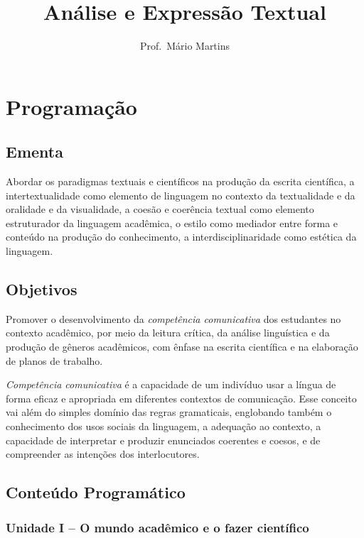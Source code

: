 \documentclass[
]{book}
\title{Análise e Expressão Textual}
\author{Prof.~Mário Martins}
\date{}
\begin{document}
\maketitle

{
\setcounter{tocdepth}{1}
\tableofcontents
}
\chapter{Programação}\label{programauxe7uxe3o}

\section{Ementa}\label{ementa}

Abordar os paradigmas textuais e científicos na produção da escrita científica, a intertextualidade como elemento de linguagem no contexto da textualidade e da oralidade e da visualidade, a coesão e coerência textual como elemento estruturador da linguagem acadêmica, o estilo como mediador entre forma e conteúdo na produção do conhecimento, a interdisciplinaridade como estética da linguagem.

\section{Objetivos}\label{objetivos}

Promover o desenvolvimento da \emph{competência comunicativa} dos estudantes no contexto acadêmico, por meio da leitura crítica, da análise linguística e da produção de gêneros acadêmicos, com ênfase na escrita científica e na elaboração de planos de trabalho.

\emph{Competência comunicativa} é a capacidade de um indivíduo usar a língua de forma eficaz e apropriada em diferentes contextos de comunicação. Esse conceito vai além do simples domínio das regras gramaticais, englobando também o conhecimento dos usos sociais da linguagem, a adequação ao contexto, a capacidade de interpretar e produzir enunciados coerentes e coesos, e de compreender as intenções dos interlocutores.

\section{Conteúdo Programático}\label{conteuxfado-programuxe1tico}

\subsection{Unidade I -- O mundo acadêmico e o fazer científico}\label{unidade-i-o-mundo-acaduxeamico-e-o-fazer-cientuxedfico}
\end{document}
